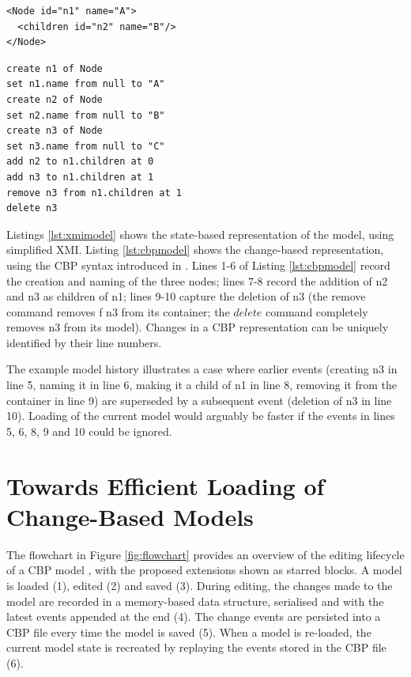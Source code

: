 \vspace{-20pt}
\begin{minipage}[t]{0.5\linewidth}
\begin{lstlisting}[style=xmi,caption={State-based tree model.},label=lst:xmimodel]
<Node id="n1" name="A">
  <children id="n2" name="B"/>
</Node>
\end{lstlisting}
\end{minipage}
\hfill
\begin{minipage}[t]{0.5\linewidth}
\begin{lstlisting}[style=eol,caption={Change-based tree model.},label=lst:cbpmodel]
create n1 of Node
set n1.name from null to "A"  
create n2 of Node
set n2.name from null to "B"  
create n3 of Node
set n3.name from null to "C"  
add n2 to n1.children at 0  
add n3 to n1.children at 1
remove n3 from n1.children at 1
delete n3
\end{lstlisting}
\end{minipage}

Listings \ref{lst:xmimodel} shows the state-based representation of the model, using simplified XMI. Listing \ref{lst:cbpmodel} shows the change-based representation, using the CBP syntax introduced in \cite{yohannis2017turning}. Lines 1-6 of Listing \ref{lst:cbpmodel} record the creation and naming of the three nodes; lines 7-8 record the addition of \textsf{n2} and \textsf{n3} as children of \textsf{n1}; lines 9-10 capture the deletion of \textsf{n3} (the \textsf{remove} command removes f \textsf{n3} from its container; the $delete$ command completely removes \textsf{n3} from its model). Changes in a CBP representation can be uniquely identified by their line numbers.

The example model history illustrates a case where  earlier events (creating \textsf{n3} in line 5, naming it in line 6, making it a child of \textsf{n1} in line 8, removing it from the container in line 9) are superseded by a subsequent event (deletion of \textsf{n3} in line 10).  Loading of the current model would arguably be faster if the events in lines 5, 6, 8, 9 and 10 could be ignored.

\section{Towards Efficient Loading of Change-Based Models}
\label{sec:loading_time_optimisation}

The flowchart in Figure \ref{fig:flowchart} provides an overview of the editing lifecycle of a CBP model \cite{DBLP:conf/models/YohannisKP17}, with the proposed extensions shown as starred blocks. A model is loaded (1), edited (2) and saved (3).  During editing, the changes made to the model are recorded in a memory-based data structure, serialised and with the latest events appended at the end (4). The change events are persisted into a CBP file every time the model is saved (5). When a model is re-loaded, the current model state is recreated by replaying the events stored in the CBP file (6).


